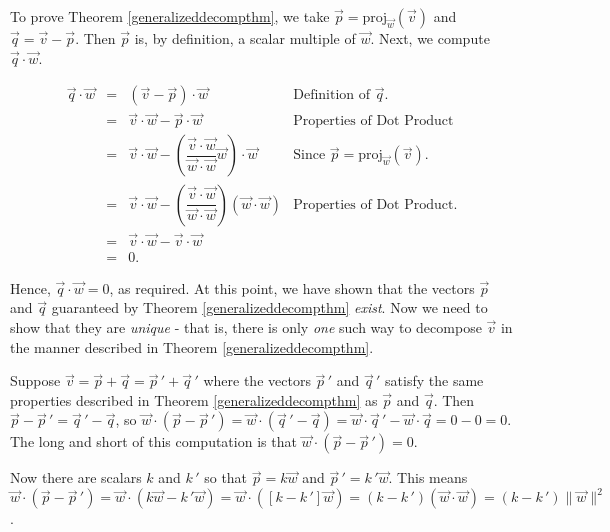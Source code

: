 \documentclass{ximera}
\begin{document}
\smallskip

To prove Theorem \ref{generalizeddecompthm}, we take  $\vec{p} = \text{proj}_{\vec{w}}(\vec{v})$ and $\vec{q} = \vec{v} - \vec{p}$.  Then  $\vec{p}$ is, by definition, a scalar multiple of $\vec{w}$.  Next, we compute $\vec{q} \cdot \vec{w}$.

\[ \begin{array}{rcll}

\vec{q} \cdot \vec{w} & = & (\vec{v} - \vec{p}) \cdot \vec{w}& \text{Definition of $\vec{q}$.} \\ [3pt]
											& = & \vec{v} \cdot \vec{w} - \vec{p} \cdot \vec{w} & \text{Properties of Dot Product} \\ [8pt]
											& = & \vec{v} \cdot \vec{w} - \left(\dfrac{\vec{v} \cdot \vec{w}}{\vec{w} \cdot \vec{w}} \vec{w}\right) \cdot \vec{w} & \text{Since $\vec{p} = \text{proj}_{\vec{w}}(\vec{v})$.} \\ [8pt]
											& = & \vec{v} \cdot \vec{w} - \left(\dfrac{\vec{v} \cdot \vec{w}}{\vec{w} \cdot \vec{w}}\right) (\vec{w} \cdot \vec{w}) & \text{Properties of Dot Product.} \\ [8pt]
											& = & \vec{v} \cdot \vec{w} - \vec{v}\cdot \vec{w} & \\ [3pt]
											& = & 0. & \end{array} \]
											
Hence, $\vec{q} \cdot \vec{w} = 0$, as required.  At this point, we have shown that the vectors $\vec{p}$ and $\vec{q}$ guaranteed by Theorem \ref{generalizeddecompthm} \textit{exist}.  Now we need to show that they are \textit{unique} - that is, there is only \textit{one} such way to decompose $\vec{v}$ in the manner described in  Theorem \ref{generalizeddecompthm}.


\smallskip

Suppose $\vec{v} = \vec{p} + \vec{q} = \vec{p} \,' + \vec{q} \,'$ where the vectors $\vec{p} \,'$ and $\vec{q} \,'$ satisfy the same properties described in  Theorem \ref{generalizeddecompthm} as $\vec{p}$ and $\vec{q}$.  Then $\vec{p} - \vec{p} \,' = \vec{q} \,' - \vec{q}$, so $\vec{w} \cdot (\vec{p} - \vec{p} \,') = \vec{w} \cdot (\vec{q} \,' - \vec{q}) = \vec{w} \cdot \vec{q} \,' - \vec{w} \cdot \vec{q} = 0 - 0 = 0$.  The long and short of this computation is that $\vec{w} \cdot (\vec{p} - \vec{p} \,') = 0$. 

\smallskip

Now there are scalars $k$ and $k \,'$ so that $\vec{p} = k \vec{w}$ and $\vec{p} \,' = k\,'\vec{w}$.   This means  $\vec{w} \cdot (\vec{p} - \vec{p} \,') = \vec{w} \cdot ( k \vec{w} - k \,' \vec{w}) = \vec{w} \cdot ([k - k \,'] \vec{w}) = (k - k \,') (\vec{w} \cdot \vec{w}) = (k - k \,') \| \vec{w} \|^2$.  
\end{document}
